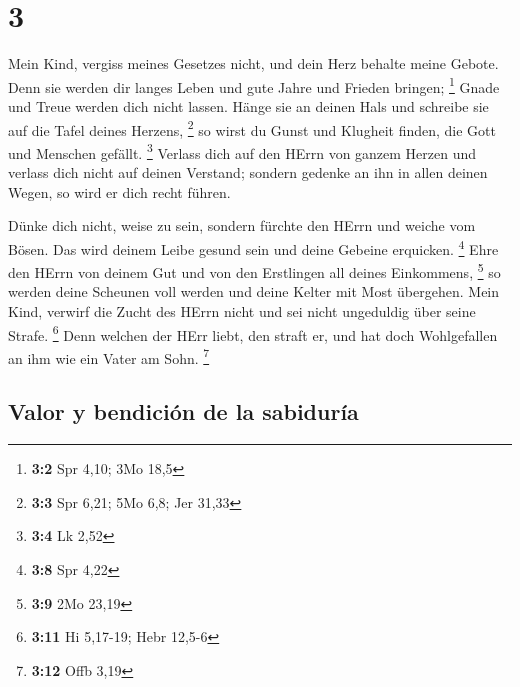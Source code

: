 \hypertarget{section-2}{%
\section{3}\label{section-2}}

 Mein Kind, vergiss meines Gesetzes nicht, und dein Herz
behalte meine Gebote.  Denn sie werden dir langes Leben
und gute Jahre und Frieden bringen; \footnote{\textbf{3:2} Spr 4,10; 3Mo
  18,5}  Gnade und Treue werden dich nicht lassen. Hänge
sie an deinen Hals und schreibe sie auf die Tafel deines Herzens,
\footnote{\textbf{3:3} Spr 6,21; 5Mo 6,8; Jer 31,33}  so
wirst du Gunst und Klugheit finden, die Gott und Menschen gefällt.
\footnote{\textbf{3:4} Lk 2,52}  Verlass dich auf den
HErrn von ganzem Herzen und verlass dich nicht auf deinen Verstand;
 sondern gedenke an ihn in allen deinen Wegen, so wird er
dich recht führen.

 Dünke dich nicht, weise zu sein, sondern fürchte den
HErrn und weiche vom Bösen.  Das wird deinem Leibe gesund
sein und deine Gebeine erquicken. \footnote{\textbf{3:8} Spr 4,22}
 Ehre den HErrn von deinem Gut und von den Erstlingen all
deines Einkommens, \footnote{\textbf{3:9} 2Mo 23,19}  so
werden deine Scheunen voll werden und deine Kelter mit Most übergehen.
 Mein Kind, verwirf die Zucht des HErrn nicht und sei
nicht ungeduldig über seine Strafe. \footnote{\textbf{3:11} Hi 5,17-19;
  Hebr 12,5-6}  Denn welchen der HErr liebt, den straft
er, und hat doch Wohlgefallen an ihm wie ein Vater am Sohn. \footnote{\textbf{3:12}
  Offb 3,19}

\hypertarget{valor-y-bendiciuxf3n-de-la-sabiduruxeda}{%
\subsection{Valor y bendición de la
sabiduría}\label{valor-y-bendiciuxf3n-de-la-sabiduruxeda}}

